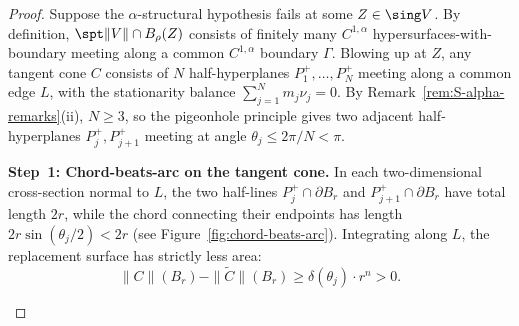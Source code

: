 \begin{proof}
Suppose the $\alpha$-structural hypothesis fails at some $Z \in \sing V$. By definition, $\spt\|V\| \cap B_\rho(Z)$ consists of finitely many $C^{1,\alpha}$ hypersurfaces-with-boundary meeting along a common $C^{1,\alpha}$ boundary $\Gamma$. Blowing up at $Z$, any tangent cone $C$ consists of $N$ half-hyperplanes $P_1^+, \ldots, P_N^+$ meeting along a common edge $L$, with the stationarity balance $\sum_{j=1}^N m_j \nu_j = 0$. By Remark~\ref{rem:S-alpha-remarks}(ii), $N \geq 3$, so the pigeonhole principle gives two adjacent half-hyperplanes $P_j^+, P_{j+1}^+$ meeting at angle $\theta_j \leq 2\pi/N < \pi$.

\medskip\noindent\textbf{Step~1: Chord-beats-arc on the tangent cone.}
In each two-dimensional cross-section normal to $L$, the two half-lines $P_j^+ \cap \partial B_r$ and $P_{j+1}^+ \cap \partial B_r$ have total length $2r$, while the chord connecting their endpoints has length $2r\sin(\theta_j/2) < 2r$ (see Figure~\ref{fig:chord-beats-arc}). Integrating along $L$, the replacement surface has strictly less area:
\[
    \|C\|(B_r) - \|\widetilde{C}\|(B_r) \geq \delta(\theta_j) \cdot r^n > 0.
\]

    \begin{figure}[ht]
        \centering
\end{figure}
\end{proof}
